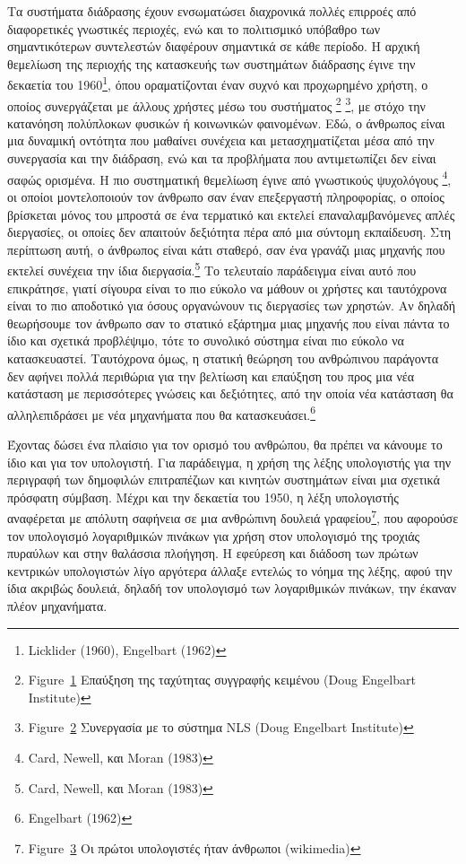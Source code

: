 \documentclass[
]{article}
\begin{document}
Τα συστήματα διάδρασης έχουν ενσωματώσει διαχρονικά πολλές επιρροές από
διαφορετικές γνωστικές περιοχές, ενώ και το πολιτισμικό υπόβαθρο των
σημαντικότερων συντελεστών διαφέρουν σημαντικά σε κάθε περίοδο. Η αρχική
θεμελίωση της περιοχής της κατασκευής των συστημάτων διάδρασης έγινε την
δεκαετία του 1960\footnote{Licklider (1960), Engelbart (1962)}, όπου
οραματίζονται έναν συχνό και προχωρημένο χρήστη, ο οποίος συνεργάζεται
με άλλους χρήστες μέσω του συστήματος \footnote{Figure~\protect\hyperlink{fig:augmentation-typewriter}{1}
  Επαύξηση της ταχύτητας συγγραφής κειμένου (Doug Engelbart Institute)}
\footnote{Figure~\protect\hyperlink{fig:nls-cscw}{2} Συνεργασία με το
  σύστημα NLS (Doug Engelbart Institute)}, με στόχο την κατανόηση
πολύπλοκων φυσικών ή κοινωνικών φαινομένων. Εδώ, ο άνθρωπος είναι μια
δυναμική οντότητα που μαθαίνει συνέχεια και μετασχηματίζεται μέσα από
την συνεργασία και την διάδραση, ενώ και τα προβλήματα που αντιμετωπίζει
δεν είναι σαφώς ορισμένα. Η πιο συστηματική θεμελίωση έγινε από
γνωστικούς ψυχολόγους \footnote{Card, Newell, και Moran (1983)}, οι
οποίοι μοντελοποιούν τον άνθρωπο σαν έναν επεξεργαστή πληροφορίας, ο
οποίος βρίσκεται μόνος του μπροστά σε ένα τερματικό και εκτελεί
επαναλαμβανόμενες απλές διεργασίες, οι οποίες δεν απαιτούν δεξιότητα
πέρα από μια σύντομη εκπαίδευση. Στη περίπτωση αυτή, ο άνθρωπος είναι
κάτι σταθερό, σαν ένα γρανάζι μιας μηχανής που εκτελεί συνέχεια την ίδια
διεργασία.\footnote{Card, Newell, και Moran (1983)} Το τελευταίο
παράδειγμα είναι αυτό που επικράτησε, γιατί σίγουρα είναι το πιο εύκολο
να μάθουν οι χρήστες και ταυτόχρονα είναι το πιο αποδοτικό για όσους
οργανώνουν τις διεργασίες των χρηστών. Αν δηλαδή θεωρήσουμε τον άνθρωπο
σαν το στατικό εξάρτημα μιας μηχανής που είναι πάντα το ίδιο και σχετικά
προβλέψιμο, τότε το συνολικό σύστημα είναι πιο εύκολο να κατασκευαστεί.
Ταυτόχρονα όμως, η στατική θεώρηση του ανθρώπινου παράγοντα δεν αφήνει
πολλά περιθώρια για την βελτίωση και επαύξηση του προς μια νέα κατάσταση
με περισσότερες γνώσεις και δεξιότητες, από την οποία νέα κατάσταση θα
αλληλεπιδράσει με νέα μηχανήματα που θα κατασκευάσει.\footnote{Engelbart
  (1962)}

Έχοντας δώσει ένα πλαίσιο για τον ορισμό του ανθρώπου, θα πρέπει να
κάνουμε το ίδιο και για τον υπολογιστή. Για παράδειγμα, η χρήση της
λέξης υπολογιστής για την περιγραφή των δημοφιλών επιτραπέζιων και
κινητών συστημάτων είναι μια σχετικά πρόσφατη σύμβαση. Μέχρι και την
δεκαετία του 1950, η λέξη υπολογιστής αναφέρεται με απόλυτη σαφήνεια σε
μια ανθρώπινη δουλειά γραφείου\footnote{Figure~\protect\hyperlink{fig:human-computers}{3}
  Οι πρώτοι υπολογιστές ήταν άνθρωποι (wikimedia)}, που αφορούσε τον
υπολογισμό λογαριθμικών πινάκων για χρήση στον υπολογισμό της τροχιάς
πυραύλων και στην θαλάσσια πλοήγηση. Η εφεύρεση και διάδοση των πρώτων
κεντρικών υπολογιστών λίγο αργότερα άλλαξε εντελώς το νόημα της λέξης,
αφού την ίδια ακριβώς δουλειά, δηλαδή τον υπολογισμό των λογαριθμικών
πινάκων, την έκαναν πλέον μηχανήματα.
\end{document}
